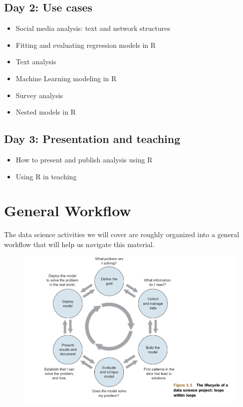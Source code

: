 \documentclass[12pt,]{book}
\providecommand{\tightlist}{%
  \setlength{\itemsep}{0pt}\setlength{\parskip}{0pt}}
\theoremstyle{definition}
\theoremstyle{definition}
\theoremstyle{definition}
\theoremstyle{remark}
\begin{document}
\subsection{Day 2: Use cases}\label{day-2-use-cases}

\begin{itemize}
\tightlist
\item
  Social media analysis: text and network structures
\item
  Fitting and evaluating regression models in R
\item
  Text analysis
\item
  Machine Learning modeling in R
\item
  Survey analysis
\item
  Nested models in R
\end{itemize}

\subsection{Day 3: Presentation and
teaching}\label{day-3-presentation-and-teaching}

\begin{itemize}
\tightlist
\item
  How to present and publish analysis using R
\item
  Using R in teaching
\end{itemize}

\section{General Workflow}\label{general-workflow}

The data science activities we will cover are roughly organized into a
general workflow that will help us navigate this material.

\begin{figure}
\centering
\includegraphics{img/zumel_mount_cycle.png}
\caption{}
\end{figure}
\end{document}
